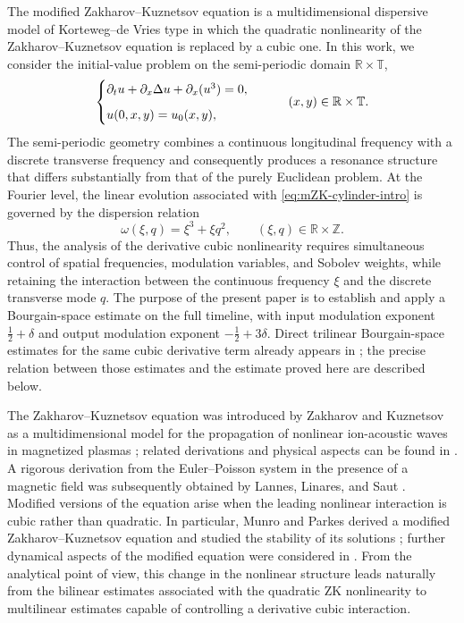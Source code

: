 \documentclass[12pt,oneside,reqno]{amsart}
\numberwithin{equation}{section}
\theoremstyle{plain}
\def\R{{\mathbb R}}
\def\Z{{\mathbb Z}}
\def\T{{\mathbb T}}
\begin{document}
The modified Zakharov--Kuznetsov equation is a multidimensional dispersive
model of Korteweg--de Vries type in which the quadratic nonlinearity of the
Zakharov--Kuznetsov equation is replaced by a cubic one. In this work, we
consider the initial-value problem on the semi-periodic domain
$\R\times\T$,
\begin{equation}
\label{eq:mZK-cylinder-intro}
\begin{cases}
    \partial_t u+\partial_x\Delta u+\partial_x(u^3)=0,\vspace{ 0.6 em}
    \\
    u(0,x,y)=u_0(x,y),
\end{cases}
\qquad
(x,y)\in\R\times\T.
\end{equation}
The semi-periodic geometry combines a continuous longitudinal frequency with
a discrete transverse frequency and consequently produces a resonance
structure that differs substantially from that of the purely Euclidean
problem. At the Fourier level, the linear evolution associated with
\eqref{eq:mZK-cylinder-intro} is governed by the dispersion relation
\begin{equation}
\label{eq:mZK-dispersion-intro}
    \omega(\xi,q)=\xi^3+\xi q^2,
    \qquad
    (\xi,q)\in\R\times\Z.
\end{equation}
Thus, the analysis of the derivative cubic nonlinearity requires simultaneous
control of spatial frequencies, modulation variables, and Sobolev weights,
while retaining the interaction between the continuous frequency $\xi$ and
the discrete transverse mode $q$. The purpose of the present paper is to
establish and apply a Bourgain-space estimate on the full timeline, with input
modulation exponent $\frac12+\delta$ and output modulation exponent
$-\frac12+3\delta$. Direct trilinear Bourgain-space estimates for the same
cubic derivative term already appears in
\cite{farah2024note,nowickikoth2026strichartz}; the precise relation between
those estimates and the estimate proved here are described below.

The Zakharov--Kuznetsov equation was introduced by Zakharov and Kuznetsov as
a multidimensional model for the propagation of nonlinear ion-acoustic waves
in magnetized plasmas \cite{zakharov1974three}; related derivations and
physical aspects can be found in
\cite{laedke1982nonlinear,infeld2000nonlinear}. A rigorous derivation from the
Euler--Poisson system in the presence of a magnetic field was subsequently
obtained by Lannes, Linares, and Saut \cite{lannes2013cauchy}. Modified
versions of the equation arise when the leading nonlinear interaction is
cubic rather than quadratic. In particular, Munro and Parkes derived a
modified Zakharov--Kuznetsov equation and studied the stability of its
solutions \cite{munro1999derivation}; further dynamical aspects of the
modified equation were considered in \cite{sipcic2000lump}. From the
analytical point of view, this change in the nonlinear structure leads
naturally from the bilinear estimates associated with the quadratic ZK
nonlinearity to multilinear estimates capable of controlling a derivative
cubic interaction.
\end{document}
